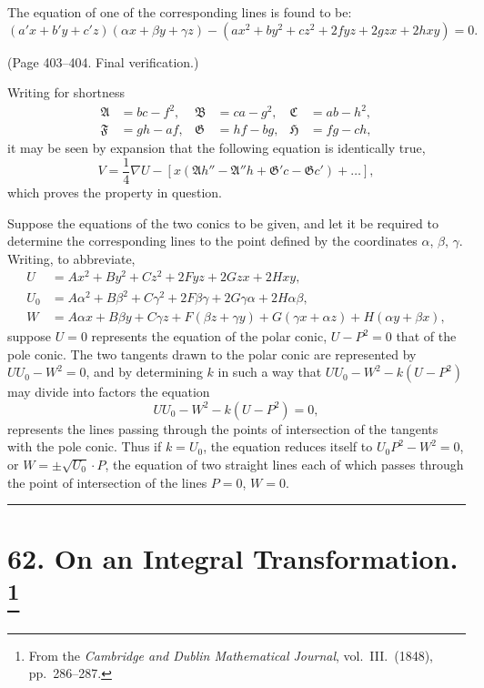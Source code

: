\documentclass[11pt,a4paper]{book}
\begin{document}
The equation of one of the corresponding lines is found to be:
\[
(a'x + b'y + c'z)(\alpha x + \beta y + \gamma z) - (ax^2 + by^2 + cz^2 + 2fyz + 2gzx + 2hxy) = 0.
\]

(Page 403--404. Final verification.)

Writing for shortness
\begin{align*}
\mathfrak{A} &= bc - f^2, & \mathfrak{B} &= ca - g^2, & \mathfrak{C} &= ab - h^2, \\
\mathfrak{F} &= gh - af, & \mathfrak{G} &= hf - bg, & \mathfrak{H} &= fg - ch,
\end{align*}
it may be seen by expansion that the following equation is identically true,
\[
V = \frac{1}{4}\nabla U - [x(\mathfrak{A}h'' - \mathfrak{A}''h + \mathfrak{G}'c - \mathfrak{G}c') + \ldots],
\]
which proves the property in question.

Suppose the equations of the two conics to be given, and let it be required to
determine the corresponding lines to the point defined by the coordinates $\alpha$, $\beta$, $\gamma$.
Writing, to abbreviate,
\begin{align*}
U &= Ax^2 + By^2 + Cz^2 + 2Fyz + 2Gzx + 2Hxy, \\
U_0 &= A\alpha^2 + B\beta^2 + C\gamma^2 + 2F\beta\gamma + 2G\gamma\alpha + 2H\alpha\beta, \\
W &= A\alpha x + B\beta y + C\gamma z + F(\beta z + \gamma y) + G(\gamma x + \alpha z) + H(\alpha y + \beta x),
\end{align*}
suppose $U = 0$ represents the equation of the polar conic, $U - P^2 = 0$ that of the pole
conic. The two tangents drawn to the polar conic are represented by $UU_0 - W^2 = 0$, and
by determining $k$ in such a way that $UU_0 - W^2 - k(U - P^2)$ may divide into factors
the equation
\[
UU_0 - W^2 - k(U - P^2) = 0,
\]
represents the lines passing through the points of intersection of the tangents with the pole
conic. Thus if $k = U_0$, the equation reduces itself to $U_0P^2 - W^2 = 0$, or $W = \pm\sqrt{U_0} \cdot P$,
the equation of two straight lines each of which passes through the point of intersection
of the lines $P = 0$, $W = 0$.

\bigskip
\hrule
\bigskip

\newpage
\section[On an Integral Transformation]{%
62. On an Integral Transformation.%
\footnote{From the \textit{Cambridge and Dublin Mathematical Journal}, vol.~III.\ (1848), pp.~286--287.}}
\end{document}
